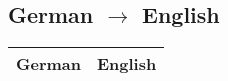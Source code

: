 \documentclass[a4paper, 11pt, accentcolor = tud3b]{tudreport}
\begin{document}
			\subsection{German \(\to\) English}
				\begin{table}[H]
					\centering
					\begin{tabular}{l|l}
						\textbf{German} & \textbf{English} \\ \hline
						
					\end{tabular}
				\end{table}
\end{document}
